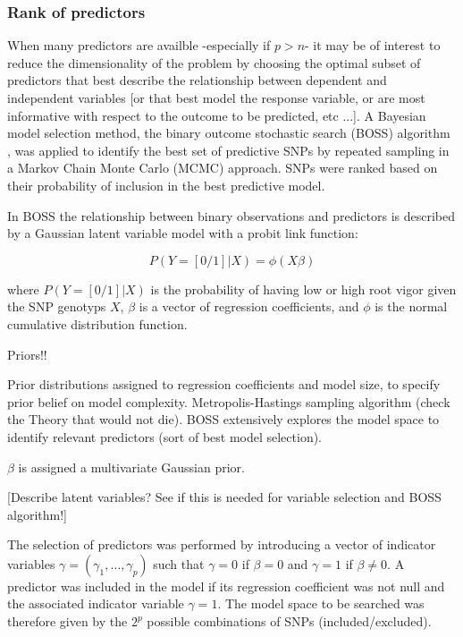 \subsubsection{Rank of predictors}
\label{par:boss}
When many predictors are availble -especially if $p>n$- it may be
of interest to reduce the dimensionality of the problem by choosing the
optimal subset of predictors that best describe the relationship between
dependent and independent variables [or that best model the response
variable, or are most informative with respect to the outcome to be
predicted, etc ...].
A Bayesian model selection method, the binary outcome stochastic search
(BOSS) algorithm \cite{russu2012stochastic}, was applied to identify the best set of predictive
SNPs by repeated sampling in a Markov Chain Monte
Carlo (MCMC) approach.  
SNPs were ranked based on their probability of inclusion in the best
predictive model.
 
In BOSS the relationship between binary observations and predictors is
described by a Gaussian latent variable model with a probit link function:

\begin{equation}
P(Y=[0/1]|X)=\phi(X \beta)
\label{eq:probit}
\end{equation} 

where $P(Y=[0/1]|X)$ is the probability of having low or high root vigor
given the SNP genotyps $X$, $\beta$ is a vector of regression
coefficients, and $\phi$ is the normal cumulative distribution function. 

Priors!!

Prior distributions assigned
to regression coefficients and model size, to specify prior belief on
model complexity.
Metropolis-Hastings sampling algorithm (check the Theory that would not die). 
BOSS extensively explores the model space to identify relevant
predictors (sort of best model selection).

  
$\beta$ is assigned a multivariate Gaussian prior.

[Describe latent variables? See if this is needed for variable selection
and BOSS algorithm!]

The selection of predictors was performed by introducing a vector of
indicator variables $\gamma=(\gamma_1, \ldots, \gamma_p)$ such that
$\gamma=0$ if $\beta=0$ and $\gamma=1$ if $\beta \neq 0$. A predictor
was included in the model if its regression coefficient was
not null and the associated indicator variable $\gamma=1$.
The model space to be searched was therefore given by the $2^p$ possible
combinations of SNPs (included/excluded).

